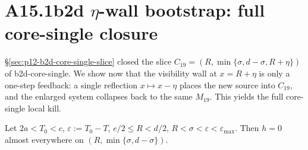 \section{A15.1b2d $\eta$-wall bootstrap: full core-single closure}
\label{sec:p12-b2d-eta-wall}

\S\ref{sec:p12-b2d-core-single-slice} closed the slice
$C_{19} = (R, \min\{\sigma, d - \sigma, R + \eta\})$ of b2d-core-single.
We show now that the visibility wall at $x = R + \eta$ is only a
one-step feedback: a single reflection $x \mapsto x - \eta$ places
the new source into $C_{19}$, and the enlarged system collapses back
to the same $M_{19}$.  This yields the full core-single local kill.

\begin{theorem}
\label{thm:p12-b2d-core-single-full}
Let $2a < T_0 < c$, $\varepsilon := T_0 - T$,
$e/2 \le R < d/2$, $R < \sigma < \varepsilon < \varepsilon_{\max}$.
Then $h = 0$ almost everywhere on
$(R, \min\{\sigma, d - \sigma\})$.
\end{theorem}

